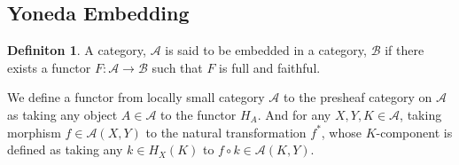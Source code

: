 \documentclass[18pt,a4paper]{article}
\theoremstyle{definition}
\newtheorem{definition}[theorem]{Definiton}
\begin{document}
	\subsection{Yoneda Embedding}%
	\begin{definition} %
		A category, $\mathcal{A}$  is said to be embedded in a category, $\mathcal{B}$ if there exists a
		functor $F: \mathcal{A} \to \mathcal{B} $ such that $F$ is full and faithful.
	\end{definition} %

	We define a functor from locally small category $\mathcal{A}$ to the presheaf category on
	$\mathcal{A} $ as taking any object $A \in \mathcal{A} $ to the functor $H_A$.
	And for any $X,Y,K \in \mathcal{A}$, taking morphism $f\in \mathcal{A} (X,Y)$
	to the natural transformation $f^*$, whose $K$-component is defined as taking any $k \in H_X(K)$
	to $f \circ k \in \mathcal{A} (K,Y)$.
\end{document}
